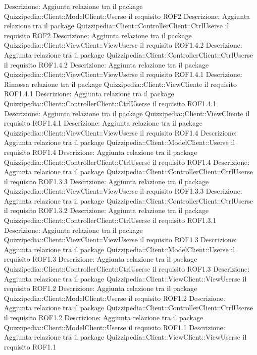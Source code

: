 Descrizione: Aggiunta relazione tra il package Quizzipedia::Client::ModelClient::Userse il requisito ROF2 
Descrizione: Aggiunta relazione tra il package Quizzipedia::Client::ControllerClient::CtrlUserse il requisito ROF2 
Descrizione: Aggiunta relazione tra il package Quizzipedia::Client::ViewClient::ViewUserse il requisito ROF1.4.2 
Descrizione: Aggiunta relazione tra il package Quizzipedia::Client::ControllerClient::CtrlUserse il requisito ROF1.4.2 
Descrizione: Aggiunta relazione tra il package Quizzipedia::Client::ViewClient::ViewUserse il requisito ROF1.4.1 
Descrizione: Rimossa relazione tra il package Quizzipedia::Client::ViewCliente il requisito ROF1.4.1 
Descrizione: Aggiunta relazione tra il package Quizzipedia::Client::ControllerClient::CtrlUserse il requisito ROF1.4.1 
Descrizione: Aggiunta relazione tra il package Quizzipedia::Client::ViewCliente il requisito ROF1.4.1 
Descrizione: Aggiunta relazione tra il package Quizzipedia::Client::ViewClient::ViewUserse il requisito ROF1.4 
Descrizione: Aggiunta relazione tra il package Quizzipedia::Client::ModelClient::Userse il requisito ROF1.4 
Descrizione: Aggiunta relazione tra il package Quizzipedia::Client::ControllerClient::CtrlUserse il requisito ROF1.4 
Descrizione: Aggiunta relazione tra il package Quizzipedia::Client::ControllerClient::CtrlUserse il requisito ROF1.3.3 
Descrizione: Aggiunta relazione tra il package Quizzipedia::Client::ViewClient::ViewUserse il requisito ROF1.3.3 
Descrizione: Aggiunta relazione tra il package Quizzipedia::Client::ControllerClient::CtrlUserse il requisito ROF1.3.2 
Descrizione: Aggiunta relazione tra il package Quizzipedia::Client::ControllerClient::CtrlUserse il requisito ROF1.3.1 
Descrizione: Aggiunta relazione tra il package Quizzipedia::Client::ViewClient::ViewUserse il requisito ROF1.3 
Descrizione: Aggiunta relazione tra il package Quizzipedia::Client::ModelClient::Userse il requisito ROF1.3 
Descrizione: Aggiunta relazione tra il package Quizzipedia::Client::ControllerClient::CtrlUserse il requisito ROF1.3 
Descrizione: Aggiunta relazione tra il package Quizzipedia::Client::ViewClient::ViewUserse il requisito ROF1.2 
Descrizione: Aggiunta relazione tra il package Quizzipedia::Client::ModelClient::Userse il requisito ROF1.2 
Descrizione: Aggiunta relazione tra il package Quizzipedia::Client::ControllerClient::CtrlUserse il requisito ROF1.2 
Descrizione: Aggiunta relazione tra il package Quizzipedia::Client::ModelClient::Userse il requisito ROF1.1 
Descrizione: Aggiunta relazione tra il package Quizzipedia::Client::ViewClient::ViewUserse il requisito ROF1.1 
